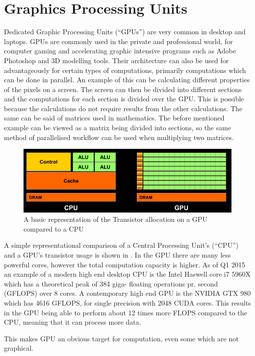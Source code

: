 \section{Graphics Processing Units}
Dedicated Graphic Processing Units (``GPUs'') are very common in desktop and laptops. \citep{STEAMHW}
GPUs are commonly used in the private and professional world, for computer gaming and accelerating graphic intensive programs such as Adobe Photoshop and 3D modelling tools. \citep{NVIDIAADOBE}
Their architecture can also be used for advantageously for certain types of computations, primarily computations which can be done in parallel. 
An example of this can be calculating different properties of the pixels on a screen. 
The screen can then be divided into different sections and the computations for each section is divided over the GPU.
This is possible because the calculations do not require results from the other calculations.
The same can be said of matrices used in mathematics.
The before mentioned example can be viewed as a matrix being divided into sections, so the same method of parallelised workflow can be used when multiplying two matrices.

\begin{figure}[h!]
\centering
 \includegraphics[width=1\textwidth]{figures/GPUCPUimage.png} %
\caption{A basic representation of the Transistor allocation on a GPU compared to a CPU}\label{image:GPUCPUimage} %
\vspace{-15pt}
\end{figure}

A simple representational comparison of a Central Processing Unit's (``CPU'') and a GPU's transistor usage is shown in .
In the GPU there are many less powerful cores, however the total computation capacity is higher. 
As of Q1 2015 an example of a modern high end desktop CPU is the Intel Haswell core i7 5960X which has a theoretical peak of 384 giga- floating operations pr. second (GFLOPS) over 8 cores. \citep{puget}
A contemporary high end GPU is the NVIDIA GTX 980 which has 4616 GFLOPS, for single precision with 2048 CUDA cores. \citep{techpowerup,gtx980}
This results in the GPU being able to perform about 12 times more FLOPS compared to the CPU, meaning that it can process more data. 

This makes GPU an obvious target for computation, even some which are not graphical. %